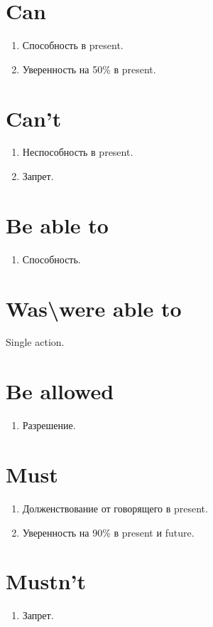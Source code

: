 \documentclass[oneside]{book}
\begin{document}
	\section{Can}
	\begin{enumerate}
		\item Способность в present.
		\item Уверенность на 50\% в present.
	\end{enumerate}

	\section{Can't}
	\begin{enumerate}
		\item Неспособность в present.
		\item Запрет.
	\end{enumerate}

	\section{Be able to}
	\begin{enumerate}
		\item Способность.
	\end{enumerate}

	\section{Was\textbackslash were able to}
	Single action.

	\section{Be allowed}
	\begin{enumerate}
		\item Разрешение.
	\end{enumerate}

	\section{Must}
	\begin{enumerate}
		\item Долженствование от говорящего в present.
		\item Уверенность на 90\% в present и future.
	\end{enumerate}

	\section{Mustn't}
	\begin{enumerate}
		\item Запрет.
	\end{enumerate}
\end{document}
